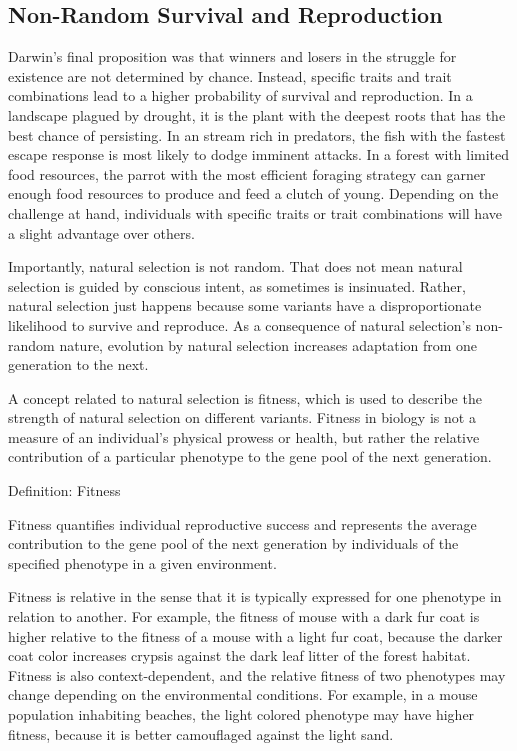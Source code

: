 \documentclass[
]{book}
\begin{document}
\hypertarget{non-random-survival-and-reproduction}{%
\subsection{Non-Random Survival and Reproduction}\label{non-random-survival-and-reproduction}}

Darwin's final proposition was that winners and losers in the struggle for existence are not determined by chance. Instead, specific traits and trait combinations lead to a higher probability of survival and reproduction. In a landscape plagued by drought, it is the plant with the deepest roots that has the best chance of persisting. In an stream rich in predators, the fish with the fastest escape response is most likely to dodge imminent attacks. In a forest with limited food resources, the parrot with the most efficient foraging strategy can garner enough food resources to produce and feed a clutch of young. Depending on the challenge at hand, individuals with specific traits or trait combinations will have a slight advantage over others.

Importantly, natural selection is not random. That does not mean natural selection is guided by conscious intent, as sometimes is insinuated. Rather, natural selection just happens because some variants have a disproportionate likelihood to survive and reproduce. As a consequence of natural selection's non-random nature, evolution by natural selection increases adaptation from one generation to the next.

A concept related to natural selection is fitness, which is used to describe the strength of natural selection on different variants. Fitness in biology is not a measure of an individual's physical prowess or health, but rather the relative contribution of a particular phenotype to the gene pool of the next generation.

Definition: Fitness

Fitness quantifies individual reproductive success and represents the average contribution to the gene pool of the next generation by individuals of the specified phenotype in a given environment.

Fitness is relative in the sense that it is typically expressed for one phenotype in relation to another. For example, the fitness of mouse with a dark fur coat is higher relative to the fitness of a mouse with a light fur coat, because the darker coat color increases crypsis against the dark leaf litter of the forest habitat. Fitness is also context-dependent, and the relative fitness of two phenotypes may change depending on the environmental conditions. For example, in a mouse population inhabiting beaches, the light colored phenotype may have higher fitness, because it is better camouflaged against the light sand.
\end{document}
